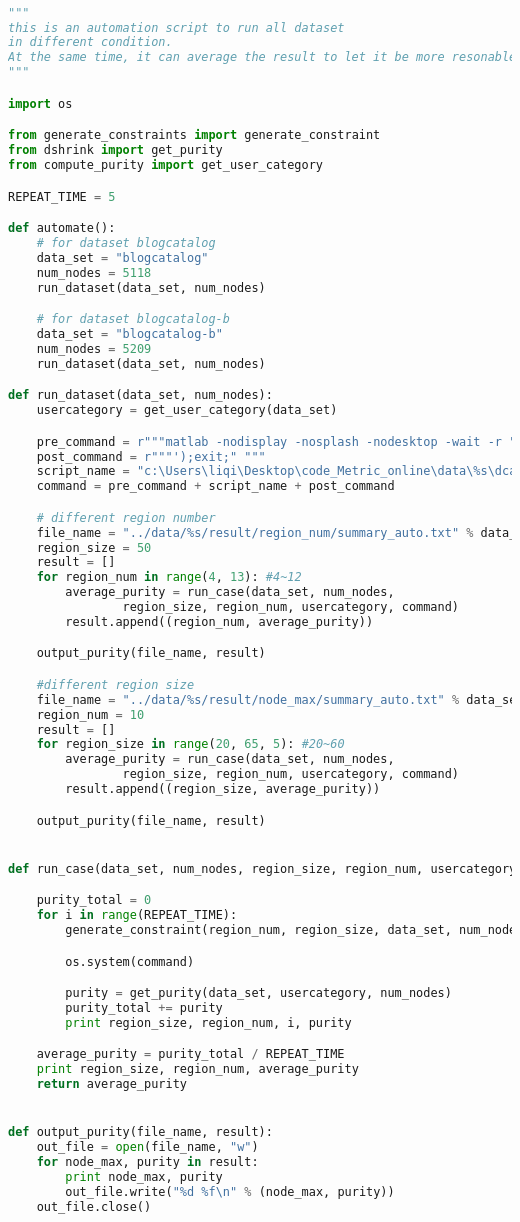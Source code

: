\begin{lstlisting}[language={python}, caption={自动化脚本}, label=code:auto]

"""
this is an automation script to run all dataset
in different condition.
At the same time, it can average the result to let it be more resonable
"""

import os

from generate_constraints import generate_constraint
from dshrink import get_purity
from compute_purity import get_user_category

REPEAT_TIME = 5

def automate():
    # for dataset blogcatalog
    data_set = "blogcatalog"
    num_nodes = 5118
    run_dataset(data_set, num_nodes)

    # for dataset blogcatalog-b
    data_set = "blogcatalog-b"
    num_nodes = 5209
    run_dataset(data_set, num_nodes)

def run_dataset(data_set, num_nodes):
    usercategory = get_user_category(data_set)

    pre_command = r"""matlab -nodisplay -nosplash -nodesktop -wait -r "run('"""
    post_command = r"""');exit;" """
    script_name = "c:\Users\liqi\Desktop\code_Metric_online\data\%s\dca_distance.m" % data_set
    command = pre_command + script_name + post_command

    # different region number
    file_name = "../data/%s/result/region_num/summary_auto.txt" % data_set
    region_size = 50
    result = []
    for region_num in range(4, 13): #4~12
        average_purity = run_case(data_set, num_nodes,
                region_size, region_num, usercategory, command)
        result.append((region_num, average_purity))

    output_purity(file_name, result)

    #different region size
    file_name = "../data/%s/result/node_max/summary_auto.txt" % data_set
    region_num = 10
    result = []
    for region_size in range(20, 65, 5): #20~60
        average_purity = run_case(data_set, num_nodes,
                region_size, region_num, usercategory, command)
        result.append((region_size, average_purity))

    output_purity(file_name, result)


def run_case(data_set, num_nodes, region_size, region_num, usercategory, command):

    purity_total = 0
    for i in range(REPEAT_TIME):
        generate_constraint(region_num, region_size, data_set, num_nodes)

        os.system(command)

        purity = get_purity(data_set, usercategory, num_nodes)
        purity_total += purity
        print region_size, region_num, i, purity

    average_purity = purity_total / REPEAT_TIME
    print region_size, region_num, average_purity
    return average_purity


def output_purity(file_name, result):
    out_file = open(file_name, "w")
    for node_max, purity in result:
        print node_max, purity
        out_file.write("%d %f\n" % (node_max, purity))
    out_file.close()
\end{lstlisting}
